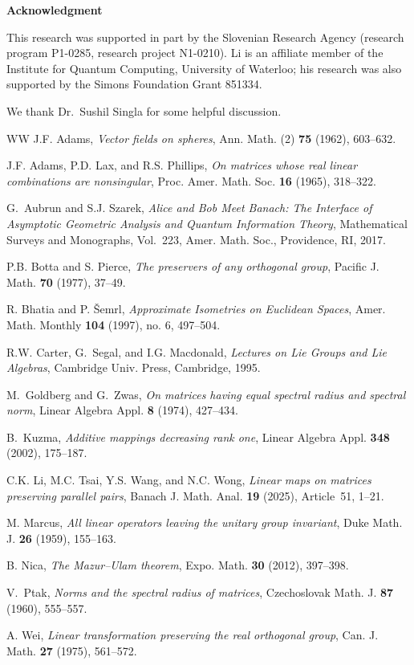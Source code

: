 \documentclass[11pt]{article}
\numberwithin{equation}{section}
\begin{document}
\medskip\noindent
{\bf \large Acknowledgment}

This research was supported in part by the Slovenian Research Agency
(research program P1-0285, research project N1-0210).
Li is an affiliate member
of the Institute for Quantum Computing, University of Waterloo; his research was also supported
by the Simons Foundation Grant 851334.


We thank Dr.\ Sushil Singla for some helpful discussion.

\begin{thebibliography}{WW}
J.F. Adams,
\emph{Vector fields on spheres},
Ann. Math. (2) \textbf{75} (1962), 603--632.

J.F. Adams, P.D. Lax, and R.S. Phillips,
\emph{On matrices whose real linear combinations are nonsingular},
Proc. Amer. Math. Soc. \textbf{16} (1965), 318--322.

G.~Aubrun and S.J. Szarek,
\emph{Alice and Bob Meet Banach: The Interface of Asymptotic Geometric Analysis and Quantum Information Theory},
Mathematical Surveys and Monographs, Vol.~223,
Amer. Math. Soc., Providence, RI, 2017.

P.B. Botta and S. Pierce,
\emph{The preservers of any orthogonal group},
Pacific J. Math. \textbf{70} (1977), 37--49.

 R. Bhatia and P. \v Semrl,
\emph{Approximate Isometries on Euclidean Spaces},
Amer. Math. Monthly \textbf{104} (1997), no. 6, 497--504.


R.W. Carter, G.~Segal, and I.G. Macdonald,
\emph{Lectures on Lie Groups and Lie Algebras},
Cambridge Univ. Press, Cambridge, 1995.

M.~Goldberg and G.~Zwas,
\emph{On matrices having equal spectral radius and spectral norm},
Linear Algebra Appl. \textbf{8} (1974), 427--434.

B.~Kuzma,
\emph{Additive mappings decreasing rank one},
Linear Algebra Appl. \textbf{348} (2002), 175--187.

C.K. Li, M.C. Tsai, Y.S. Wang, and N.C. Wong,
\emph{Linear maps on matrices preserving parallel pairs},
Banach J. Math. Anal. \textbf{19} (2025), Article~51, 1--21.

M. Marcus,
\emph{All linear operators leaving the unitary group invariant},
Duke Math. J. \textbf{26} (1959), 155--163.

B. Nica,
\emph{The Mazur–Ulam theorem},
Expo. Math. \textbf{30} (2012), 397--398.

V.~Ptak,
\emph{Norms and the spectral radius of matrices},
Czechoslovak Math. J. \textbf{87} (1960), 555--557.

A. Wei,
\emph{Linear transformation preserving the real orthogonal group},
Can. J. Math. \textbf{27} (1975), 561--572.
\end{thebibliography}
\end{document}
